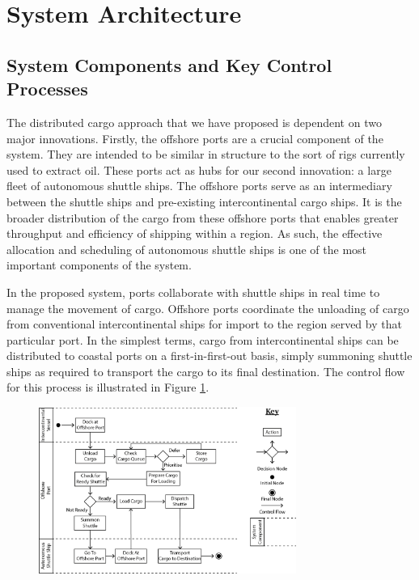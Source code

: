 \newpage
\section{System Architecture}

\subsection{System Components and Key Control Processes}
The distributed cargo approach that we have proposed is dependent on two major innovations. Firstly, the offshore ports are a crucial component of the system. They are intended to be similar in structure to the sort of rigs currently used to extract oil. These ports act as hubs for our second innovation: a large fleet of autonomous shuttle ships. The offshore ports serve as an intermediary between the shuttle ships and pre-existing intercontinental cargo ships. It is the broader distribution of the cargo from these offshore ports that enables greater throughput and efficiency of shipping within a region. As such, the effective allocation and scheduling of autonomous shuttle ships is one of the most important components of the system.

In the proposed system, ports collaborate with shuttle ships in real time to manage the movement of cargo. Offshore ports coordinate the unloading of cargo from conventional intercontinental ships for import to the region served by that particular port. In the simplest terms, cargo from intercontinental ships can be distributed to coastal ports on a first-in-first-out basis, simply summoning shuttle ships as required to transport the cargo to its final destination. The control flow for this process is illustrated in Figure \ref{fig:arch_1}.

\begin{figure}[h!]
\centering
	\includegraphics[width=0.75\textwidth]{images/arch_1}
	\caption{}
	\label{fig:arch_1}
\end{figure}

